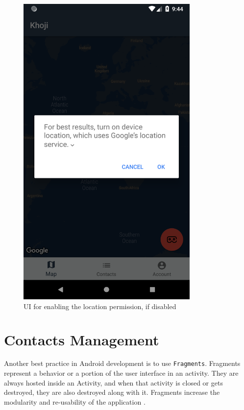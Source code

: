 \begin{figure}[H]
	\centering
		\includegraphics[width=0.80\textwidth]{images/khoji_location_permission.png}
	\caption{UI for enabling the location permission, if disabled}
	\label{fig:khoji_location_permission}
\end{figure}



\section{Contacts Management}
Another best practice in Android development is to use \texttt{Fragments}. Fragments represent a behavior or a portion of the user interface in an activity. They are always hosted inside an Activity, and when that activity is closed or gets destroyed, they are also destroyed along with it. Fragments increase the modularity and re-usability of the application \cite{AndroidFragments2018}.

